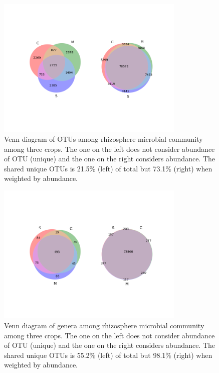 \documentclass[12pt]{article}
\begin{document}
    \begin{figure}[tbph!]
    \centering
    \includegraphics[width=0.8\textwidth]{figures/otu-venn}
    \caption[Venn diagram of OTUs]{Venn diagram of OTUs among rhizosphere microbial community among three crops. The one on the left does not consider abundance of OTU (unique) and the one on the right considers abundance. The shared unique OTUs is 21.5\% (left) of total but 73.1\% (right) when weighted by abundance.}
    \label{fig:otu-venn}
    \end{figure}


    \begin{figure}[tbph!]
    \centering
    \includegraphics[width=0.8\textwidth]{figures/genus-venn}
    \caption[Venn diagram of genera]{Venn diagram of genera among rhizosphere microbial community among three crops. The one on the left does not consider abundance of OTU (unique) and the one on the right considers abundance. The shared unique OTUs is 55.2\% (left) of total but 98.1\% (right) when weighted by abundance.}
    \label{fig:genus-venn}
    \end{figure}
\end{document}

